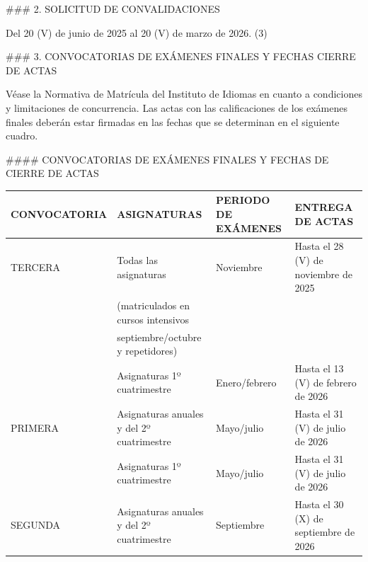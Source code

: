 \documentclass{article}
\begin{document}
\begin{itemize}
\begin{itemize}
\begin{scriptsize}
                  \#\#\# 2. SOLICITUD DE CONVALIDACIONES

                  Del 20 (V) de junio de 2025 al 20 (V) de marzo de 2026. (3)

                  \#\#\# 3. CONVOCATORIAS DE EXÁMENES FINALES Y FECHAS CIERRE DE ACTAS

                  Véase la Normativa de Matrícula del Instituto de Idiomas en cuanto a condiciones y limitaciones de concurrencia. Las actas con las calificaciones de los exámenes finales deberán estar firmadas en las fechas que se determinan en el siguiente cuadro.

                  \#\#\#\# CONVOCATORIAS DE EXÁMENES FINALES Y FECHAS DE CIERRE DE ACTAS

                  \vspace{0.4cm}
                  \begin{table}[h!]\centering\renewcommand{\arraystretch}{1.3}
                    \begin{tabular}{|p{}|p{}|p{}|p{}|}\hline
                      CONVOCATORIA & ASIGNATURAS                               & PERIODO DE EXÁMENES & ENTREGA DE ACTAS                      \\\hline
                      TERCERA      & Todas las asignaturas                     & Noviembre           & Hasta el 28 (V) de noviembre de 2025  \\\hline
                                   & (matriculados en cursos intensivos        &                     &                                       \\\hline
                                   & septiembre/octubre y repetidores)         &                     &                                       \\\hline
                                   & Asignaturas 1º cuatrimestre               & Enero/febrero       & Hasta el 13 (V) de febrero de 2026    \\\hline
                      PRIMERA      & Asignaturas anuales y del 2º cuatrimestre & Mayo/julio          & Hasta el 31 (V) de julio de 2026      \\\hline
                                   & Asignaturas 1º cuatrimestre               & Mayo/julio          & Hasta el 31 (V) de julio de 2026      \\\hline
                      SEGUNDA      & Asignaturas anuales y del 2º cuatrimestre & Septiembre          & Hasta el 30 (X) de septiembre de 2026 \\\hline
                    \end{tabular}\end{table}
                  \vspace{0.4cm}


\end{scriptsize}
\end{itemize}
\end{itemize}
\end{document}
